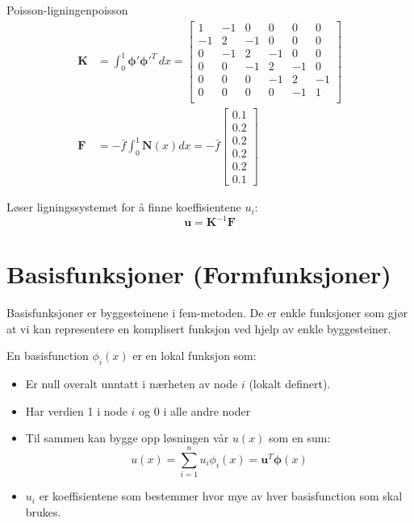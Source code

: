 \begin{example}{Poisson-ligningen}{poisson}
  \begin{align*}
    \symbf{K} & = \int_0^1 \symbf{\phi}' \symbf{\phi}'^T \, dx =
    \begin{bmatrix}
      1  & -1 & 0  & 0  & 0  & 0  \\
      -1 & 2  & -1 & 0  & 0  & 0  \\
      0  & -1 & 2  & -1 & 0  & 0  \\
      0  & 0  & -1 & 2  & -1 & 0  \\
      0  & 0  & 0  & -1 & 2  & -1 \\
      0  & 0  & 0  & 0  & -1 & 1  \\
    \end{bmatrix}                                  \\
    \symbf{F} & = - \bar{f} \int_0^1 \symbf{N}(x) dx
    = - \bar{f}
    \begin{bmatrix}
      0.1 \\ 0.2 \\ 0.2 \\ 0.2 \\ 0.2 \\ 0.1
    \end{bmatrix}
  \end{align*}

  Løser ligningssystemet for å finne koeffisientene \(u_i\):
  \[
    \symbf{u} = \symbf{K}^{-1} \symbf{F}
  \]

\end{example}

\section{Basisfunksjoner (Formfunksjoner)}

Basisfunksjoner er byggesteinene i \gls{fem}-metoden.
De er enkle funksjoner som gjør at vi kan representere en komplisert funksjon ved hjelp av enkle byggesteiner.

En \gls{basisfunction} \(\phi_i(x)\) er en lokal funksjon som:
\begin{itemize}
  \item Er null overalt unntatt i nærheten av node \(i\) (lokalt definert).
  \item Har verdien 1 i node \(i\) og 0 i alle andre noder
  \item Til sammen kan bygge opp løsningen vår \(u(x)\) som en sum:
        \[
          u(x) = \sum_{i=1}^n u_i \phi_i(x) = \symbf{u}^T \symbf{\phi}(x)
        \]
  \item \(u_i\) er koeffisientene som bestemmer hvor mye av hver \gls{basisfunction} som skal brukes.
\end{itemize}


